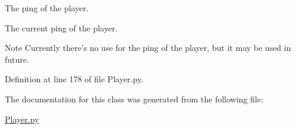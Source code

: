 The ping of the player. 

The current ping of the player. \begin{DoxyNote}{Note}
Currently there's no use for the ping of the player, but it may be used in future. 
\end{DoxyNote}


Definition at line 178 of file Player.py.



The documentation for this class was generated from the following file:\begin{DoxyCompactItemize}
\item 
\hyperlink{_player_8py}{Player.py}\end{DoxyCompactItemize}
